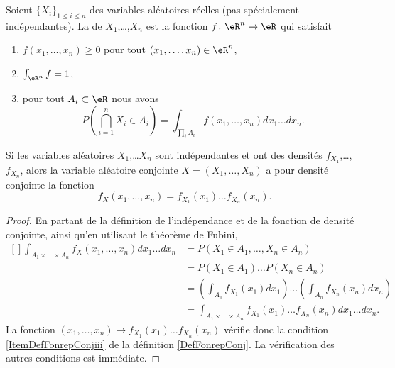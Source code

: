 \begin{definition}      \label{DefFonrepConj}
    Soient \( \{ X_i \}_{1\leq i\leq n}\) des variables aléatoires réelles (pas spécialement indépendantes). La  de \( X_1\),\ldots,\( X_n\) est la fonction \( f\colon \eR^n\to \eR\) qui satisfait
    \begin{enumerate}
        \item
            \( f(x_1,\ldots,x_n)\geq 0\) pour tout \( (x_1,\ldots,x_n)\in\eR^n\),
        \item
            \( \int_{\eR^n}f=1\),
        \item       \label{ItemDefFonrepConjiii}
            pour tout \( A_i\subset\eR \) nous avons
            \begin{equation}
                P(\bigcap_{i=1}^n X_i\in A_i)=\int_{\prod_i A_i}f(x_1,\ldots,x_n)dx_1\ldots dx_n.
            \end{equation}
    \end{enumerate}
\end{definition}

\begin{proposition}     \label{PropDensiteConjIndep}
    Si les variables aléatoires \( X_1\),\ldots \( X_n\) sont indépendantes et ont des densités \( f_{X_1}\),\ldots,\( f_{X_n}\), alors la variable aléatoire conjointe \( X=(X_1,\ldots,X_n)\) a pour densité conjointe la fonction
    \begin{equation}
        f_X(x_1,\ldots,x_n)=f_{X_1}(x_1)\ldots f_{X_n}(x_n).
    \end{equation}
\end{proposition}

\begin{proof}
    En partant de la définition de l'indépendance et de la fonction de densité conjointe, ainsi qu'en utilisant le théorème de Fubini,
    \begin{equation}
        \begin{aligned}[]
            \int_{A_1\times \ldots\times A_n}f_X(x_1,\ldots,x_n)dx_1\ldots dx_n&=
            P(X_1\in A_1,\ldots,X_n\in A_n)\\
            &=P(X_1\in A_1)\ldots P(X_n\in A_n)\\
            &=\left( \int_{A_1}f_{X_1}(x_1)dx_1 \right)\ldots\left( \int_{A_n}f_{X_n}(x_n)dx_n \right)\\
            &=\int_{A_1\times\ldots\times A_n}f_{X_1}(x_1)\ldots f_{X_n}(x_n)dx_1\ldots dx_n.
        \end{aligned}
    \end{equation}
    La fonction \( (x_1,\ldots,x_n)\mapsto f_{X_1}(x_1)\ldots f_{X_n}(x_n)\) vérifie donc la condition \ref{ItemDefFonrepConjiii} de la définition \ref{DefFonrepConj}. La vérification des autres conditions est immédiate.
\end{proof}


